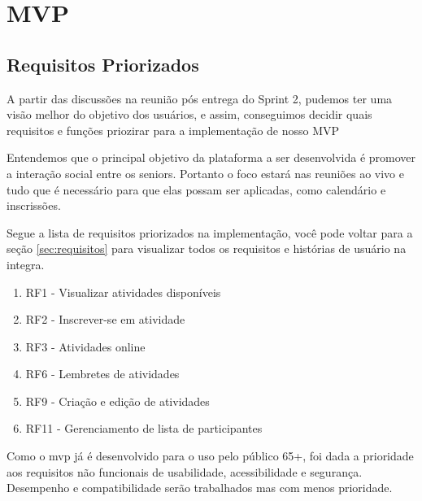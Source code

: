 \newpage
\section{MVP}

\subsection{Requisitos Priorizados}
\par A partir das discussões na reunião pós entrega do Sprint 2, pudemos ter uma visão melhor
do objetivo dos usuários, e assim, conseguimos decidir quais requisitos e funções priozirar 
para a implementação de nosso MVP
\par Entendemos que o principal objetivo da plataforma a ser desenvolvida é promover a interação
social entre os seniors. Portanto o foco estará nas reuniões ao vivo e tudo que é necessário para
que elas possam ser aplicadas, como calendário e inscrissões.
\par Segue a lista de requisitos priorizados na implementação, você pode voltar para a seção 
\ref{sec:requisitos} para visualizar todos os requisitos e histórias de usuário na integra.

\begin{enumerate}
    \item RF1 - Visualizar atividades disponíveis
    \item RF2 - Inscrever-se em atividade
    \item RF3 - Atividades online
    \item RF6 - Lembretes de atividades
    \item RF9 - Criação e edição de atividades
    \item RF11 - Gerenciamento de lista de participantes
\end{enumerate}

\par Como o mvp já é desenvolvido para o uso pelo público 65+, foi dada a prioridade aos requisitos
não funcionais de usabilidade, acessibilidade e segurança. Desempenho e compatibilidade serão trabalhados
mas com menos prioridade.
